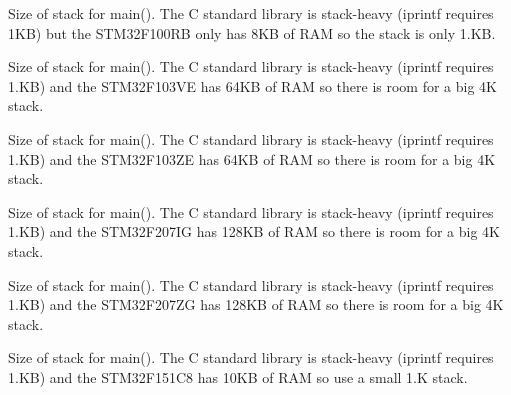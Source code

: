 Size of stack for main(). The C standard library is stack-\/heavy (iprintf requires 1\-K\-B) but the S\-T\-M32\-F100\-R\-B only has 8\-K\-B of R\-A\-M so the stack is only 1.\-K\-B.

Size of stack for main(). The C standard library is stack-\/heavy (iprintf requires 1.\-K\-B) and the S\-T\-M32\-F103\-V\-E has 64\-K\-B of R\-A\-M so there is room for a big 4\-K stack.

Size of stack for main(). The C standard library is stack-\/heavy (iprintf requires 1.\-K\-B) and the S\-T\-M32\-F103\-Z\-E has 64\-K\-B of R\-A\-M so there is room for a big 4\-K stack.

Size of stack for main(). The C standard library is stack-\/heavy (iprintf requires 1.\-K\-B) and the S\-T\-M32\-F207\-I\-G has 128\-K\-B of R\-A\-M so there is room for a big 4\-K stack.

Size of stack for main(). The C standard library is stack-\/heavy (iprintf requires 1.\-K\-B) and the S\-T\-M32\-F207\-Z\-G has 128\-K\-B of R\-A\-M so there is room for a big 4\-K stack.

Size of stack for main(). The C standard library is stack-\/heavy (iprintf requires 1.\-K\-B) and the S\-T\-M32\-F151\-C8 has 10\-K\-B of R\-A\-M so use a small 1.\-K stack.

